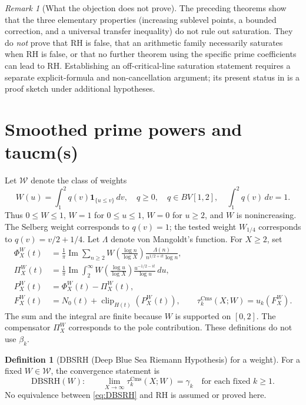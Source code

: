 \documentclass[11pt,a4paper]{article}
\numberwithin{equation}{section}
\theoremstyle{definition}
\newtheorem{definition}[theorem]{Definition}
\theoremstyle{remark}
\newtheorem{remark}[theorem]{Remark}
\newcommand{\ind}{\mathbf 1}
\newcommand{\clip}{\operatorname{clip}}
\newcommand{\Cms}{\mathrm{Cms}}
\begin{document}
\begin{remark}[What the objection does not prove]\label{rem:claude}
The preceding theorems show that the three elementary properties (increasing sublevel points, a bounded correction, and a universal transfer inequality) do not rule out saturation. They do \emph{not} prove that RH is false, that an arithmetic family necessarily saturates when RH is false, or that no further theorem using the specific prime coefficients can lead to RH. Establishing an off-critical-line saturation statement requires a separate explicit-formula and non-cancellation argument; its present status in \cite{CasanaDBSRH} is a proof sketch under additional hypotheses.
\end{remark}

\section{Smoothed prime powers and taucm(s)}\label{sec:weights}
Let $\mathcal W$ denote the class of weights
\begin{equation}\label{eq:weights}
W(u)=\int_1^2q(v)\ind_{\{u\le v\}}\,dv,
\quad q\ge0,\quad q\in BV[1,2],\quad \int_1^2q(v)\,dv=1.
\end{equation}
Thus $0\le W\le1$, $W=1$ for $0\le u\le1$, $W=0$ for $u\ge2$, and $W$ is nonincreasing. The Selberg weight corresponds to $q(v)=1$; the tested weight $W_{1/4}$ corresponds to $q(v)=v/2+1/4$. Let $\Lambda$ denote von Mangoldt's function. For $X\ge2$, set
\begin{align}
\Phi_X^W(t)&=\frac1\pi\operatorname{Im}\sum_{n\ge2}
 W\!\left(\frac{\log n}{\log X}\right)
\frac{\Lambda(n)}{n^{1/2+it}\log n},\label{eq:PhiW}\\
\Pi_X^W(t)&=\frac1\pi\operatorname{Im}\int_2^\infty
 W\!\left(\frac{\log u}{\log X}\right)
\frac{u^{-1/2-it}}{\log u}\,du,\label{eq:PiW}\\
P_X^W(t)&=\Phi_X^W(t)-\Pi_X^W(t),\label{eq:PW}\\
F_X^W(t)&=N_0(t)+\clip_{H(t)}(P_X^W(t)),\qquad
\tau_k^{\Cms}(X;W)=u_k(F_X^W).\label{eq:Cms}
\end{align}
The sum and the integral are finite because $W$ is supported on $[0,2]$. The compensator $\Pi_X^W$ corresponds to the pole contribution. These definitions do not use $\beta_k$.

\begin{definition}[DBSRH (Deep Blue Sea Riemann Hypothesis) for a weight]\label{def:DBSRH}
For a fixed $W\in\mathcal W$, the convergence statement is
\begin{equation}\label{eq:DBSRH}
\mathrm{DBSRH}(W):\qquad
\lim_{X\to\infty}\tau_k^{\Cms}(X;W)=\gamma_k
\quad\text{for each fixed }k\ge1.
\end{equation}
No equivalence between \eqref{eq:DBSRH} and RH is assumed or proved here.
\end{definition}
\end{document}
